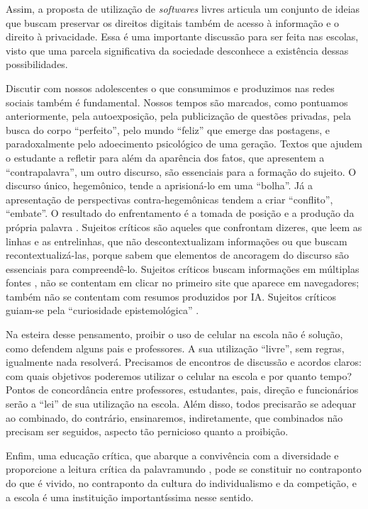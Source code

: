\documentclass[portuguese]{textolivre}
\begin{document}
Assim, a proposta de utilização de \textit{softwares} livres articula um conjunto de ideias que buscam preservar os direitos digitais também de acesso à informação e o direito à privacidade. Essa é uma importante discussão para ser feita nas escolas, visto que uma parcela significativa da sociedade desconhece a existência dessas possibilidades.

Discutir com nossos adolescentes o que consumimos e produzimos nas redes sociais também é fundamental. Nossos tempos são marcados, como pontuamos anteriormente, pela autoexposição, pela publicização de questões privadas, pela busca do corpo ``perfeito'', pelo mundo ``feliz'' que emerge das postagens, e paradoxalmente pelo adoecimento psicológico de uma geração. Textos que ajudem o estudante a refletir para além da aparência dos fatos, que apresentem a ``contrapalavra'', um outro discurso, são essenciais para a formação do sujeito. O discurso único, hegemônico, tende a aprisioná-lo em uma ``bolha''. Já a apresentação de perspectivas contra-hegemônicas tendem a criar ``conflito'', ``embate''. O resultado do enfrentamento é a tomada de posição e a produção da própria palavra \cite{bakhtin_estetica_2003}. Sujeitos críticos são aqueles que confrontam dizeres, que leem as linhas e as entrelinhas, que não descontextualizam informações ou que buscam recontextualizá-las, porque sabem que elementos de ancoragem do discurso são essenciais para compreendê-lo. Sujeitos críticos buscam informações em múltiplas fontes \cite{coscarelli_leitura_2017}, não se contentam em clicar no primeiro site que aparece em navegadores; também não se contentam com resumos produzidos por IA. Sujeitos críticos guiam-se pela ``curiosidade epistemológica'' \cite{freire_pedagogia_2011}.

Na esteira desse pensamento, proibir o uso de celular na escola não é solução, como defendem alguns pais e professores. A sua utilização ``livre'', sem regras, igualmente nada resolverá. Precisamos de encontros de discussão e acordos claros: com quais objetivos poderemos utilizar o celular na escola e por quanto tempo? Pontos de concordância entre professores, estudantes, pais, direção e funcionários serão a ``lei'' de sua utilização na escola. Além disso, todos precisarão se adequar ao combinado, do contrário, ensinaremos, indiretamente, que combinados não precisam ser seguidos, aspecto tão pernicioso quanto a proibição.

Enfim, uma educação crítica, que abarque a convivência com a diversidade e proporcione a leitura crítica da palavramundo \cite{freire_importancia_1989}, pode se constituir no contraponto do que é vivido, no contraponto da cultura do individualismo e da competição, e a escola é uma instituição importantíssima nesse sentido.
\end{document}
